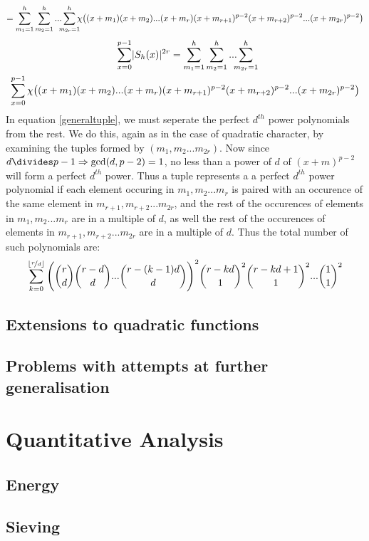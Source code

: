 \documentclass{report}
\begin{document}
$$=\sum\limits_{m_1=1}^h\sum\limits_{m_2=1}^h...\sum\limits_{\mathclap{m_{2r}=1}}^h \chi\big((x+m_1)(x+m_2)...(x+m_{r})(x+m_{r+1})^{p-2}(x+m_{r+2})^{p-2}...(x+m_{2r})^{p-2}\big)$$
\begin{multline} \label{generaltuple}
\sum_{x=0}^{p-1}\lvert S_h(x)\rvert^{2r}= \sum\limits_{m_1=1}^h\sum\limits_{m_2=1}^h...\sum\limits_{\mathclap{m_{2r}=1}}^h
\\
\sum_{x=0}^{p-1}\chi\big((x+m_1)(x+m_2)...(x+m_{r})(x+m_{r+1})^{p-2}(x+m_{r+2})^{p-2}...(x+m_{2r})^{p-2}\big)
\end{multline}
In equation \ref{generaltuple}, we must seperate the perfect $d^{th}$ power polynomials from the rest. We do this, again as in the case of quadratic character, by examining the tuples formed by $(m_1, m_2...m_{2r})$. Now since $d \divides p-1\Rightarrow \gcd(d, p-2)=1$, no less than a power of $d$ of $(x+m)^{p-2}$ will form a perfect $d^{th}$ power. Thus a tuple represents a a perfect $d^{th}$ power polynomial if each element occuring in $m_1, m_2...m_{r}$ is paired with an occurence of the same element in $m_{r+1}, m_{r+2}...m_{2r}$, and the rest of the occurences of elements in $m_1, m_2...m_{r}$ are in a multiple of $d$, as well the rest of the occurences of elements in $m_{r+1}, m_{r+2}...m_{2r}$ are in a multiple of $d$. Thus the total number of such polynomials are:
$$\sum_{k=0}^{\lfloor\nicefrac{r}{d}\rfloor}\Bigg(\binom{r}{d}\binom{r-d}{d}...\binom{r-(k-1)d}{d}\Bigg)^2\binom{r-kd}{ 1}^2 \binom{r-kd+1}{1}^2...\binom{1}{1}^2$$
%
%
\section{Extensions to quadratic functions}
%
%
\section{Problems with attempts at further generalisation}
\chapter{Quantitative Analysis}
\section{Energy}
%
%
\section{Sieving}
%
%
\end{document}

